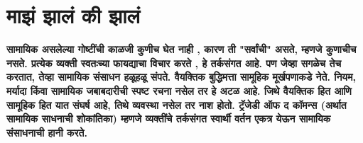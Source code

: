 \chapter{माझं झालं की झालं}

\textcolor{blue!60!black}{\textbf{सामायिक असलेल्या गोष्टींची काळजी कुणीच घेत नाही , कारण ती "सर्वांची" असते, म्हणजे कुणाचीच नसते. प्रत्येक व्यक्ती स्वतःच्या फायद्याचा विचार करते , हे तर्कसंगत आहे. पण जेव्हा सगळेच तेच करतात, तेव्हा सामायिक संसाधन हळूहळू संपते. वैयक्तिक बुद्धिमत्ता सामूहिक मूर्खपणाकडे नेते. नियम, मर्यादा किंवा सामायिक जबाबदारीची स्पष्ट रचना नसेल तर हे अटळ आहे. जिथे वैयक्तिक हित आणि सामूहिक हित यात संघर्ष आहे, तिथे व्यवस्था नसेल तर नाश होतो. ट्रॅजेडी ऑफ द कॉमन्स (अर्थात सामायिक साधनाची शोकांतिका) म्हणजे व्यक्तींचे तर्कसंगत स्वार्थी वर्तन एकत्र येऊन सामायिक संसाधनाची हानी करते.}}

